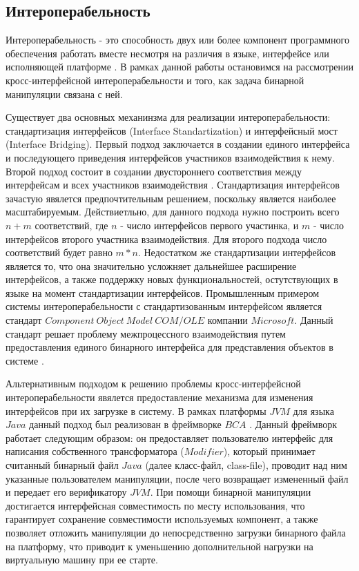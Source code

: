 \subsection{Интероперабельность}

Интероперабельность - это способность двух или более компонент программного обеспечения работать вместе несмотря на различия в языке, интерфейсе или исполняющей платформе \cite{malone2014}. В рамках данной работы остановимся на рассмотрении кросс-интерфейсной интероперабельности и того, как задача бинарной манипуляции связана с ней.

Существует два основных механинзма для реализации интероперабельности: стандартизация интерфейсов (Interface Standartization) и интерфейсный мост (Interface Bridging). Первый подход заключается в создании единого интерфейса и последующего приведения интерфейсов участников взаимодействия к нему. Второй подход состоит в создании двустороннего соответствия между интерфейсам и всех участников взаимодействия \cite{wegner1996}. Стандартизация интерфейсов зачастую явялется предпочтительным решением, поскольку является наиболее масштабируемым. Действиетльно, для данного подхода нужно построить всего $n + m$ соответствий, где $n$ - число интерфейсов первого участинка, и $m$ - число интерфейсов второго участника взаимодействия. Для второго подхода число соответствий будет равно $m * n$. Недостатком же стандартизации интерфейсов является то, что она значительно усложняет дальнейшее расширение интерфейсов, а также поддержку новых функциональностей, остутствующих в языке на момент стандартизации интерфейсов. Промышленным примером системы интероперабельности с стандартизованным интерфейсом является стандарт $Component~Object~Model~COM/OLE$ компании $Microsoft$. Данный стандарт решает проблему межпроцессного взаимодействия путем предоставления единого бинарного интерфейса для представления объектов в системе \cite{brockschmidt1995}.

Альтернативным подходом к решению проблемы кросс-интерфейсной интероперабельности явялется предоставление механизма для изменения интерфейсов при их загрузке в систему. В рамках платформы $JVM$ для языка $Java$ данный подход был реализован в фреймворке $BCA$ \cite{bca}. Данный фреймворк работает следующим образом: он предоставляет пользователю интерфейс для написания собственного трансформатора ($Modifier$), который принимает считанный бинарный файл $Java$ (далее класс-файл, class-file), проводит над ним указанные пользователем манипуляции, после чего возвращает измененный файл и передает его верификатору $JVM$. При помощи бинарной манипуляции достигается интерфейсная совместимость по месту использования, что гарантирует сохранение совместимости используемых компонент, а также позволяет отложить манипуляции до непосредственно загрузки бинарного файла на платформу, что приводит к уменьшению дополнительной нагрузки на виртуальную машину при ее старте.

